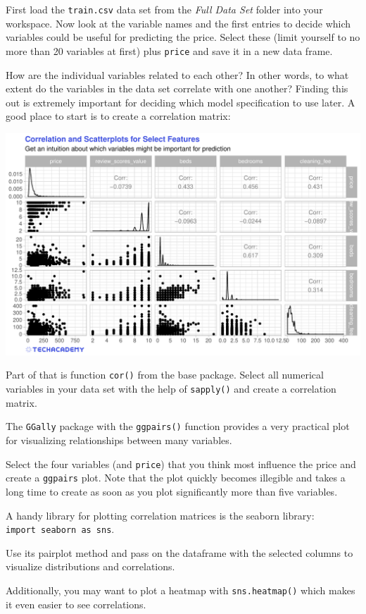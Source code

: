 \documentclass[
  11pt,
]{article}
\newenvironment{tips}[1]
  {
  \begin{itemize}
  \footnotesize
  \renewcommand{\labelitemi}{
    \raisebox{-.7\height}[0pt][0pt]{
      {\setkeys{Gin}{width=3em,keepaspectratio}
        \texttt{[image: images/\#1.png]}}
    }
  }
  \setlength{\fboxsep}{1em}
  \begin{rbox}
  \item
  }
  {
  \end{rbox}
  \end{itemize}
  }
\newenvironment{tipsp}[1]
  {
  \begin{itemize}
  \footnotesize
  \renewcommand{\labelitemi}{
    \raisebox{-.7\height}[0pt][0pt]{
      {\setkeys{Gin}{width=3em,keepaspectratio}
        \texttt{[image: images/\#1.png]}}
    }
  }
  \setlength{\fboxsep}{1em}
  \begin{pbox}
  \item
  }
  {
  \end{pbox}
  \end{itemize}
  }
\begin{document}
First load the \texttt{train.csv} data set from the \emph{Full Data Set} folder into your workspace. Now look at the variable names and the first entries to decide which variables could be useful for predicting the price. Select these (limit yourself to no more than 20 variables at first) plus \texttt{price} and save it in a new data frame.

How are the individual variables related to each other? In other words, to what extent do the variables in the data set correlate with one another? Finding this out is extremely important for deciding which model specification to use later. A good place to start is to create a correlation matrix:

\begin{center}\includegraphics[width=1\linewidth]{plot/5_1_ggpairs} \end{center}

\begin{tips}r
Part of that is function \texttt{cor()} from the base package. Select all numerical variables in your data set with the help of \texttt{sapply()} and create a correlation matrix.

The \texttt{GGally} package with the \texttt{ggpairs()} function provides a very practical plot for visualizing relationships between many variables.

Select the four variables (and \texttt{price}) that you think most influence the price and create a \texttt{ggpairs} plot. Note that the plot quickly becomes illegible and takes a long time to create as soon as you plot significantly more than five variables.

\end{tips}

\begin{tipsp}p
A handy library for plotting correlation matrices is the seaborn library: \texttt{import\ seaborn\ as\ sns}.

Use its pairplot method and pass on the dataframe with the selected columns to visualize distributions and correlations.

Additionally, you may want to plot a heatmap with \texttt{sns.heatmap()} which makes it even easier to see correlations.

\end{tipsp}
\end{document}
